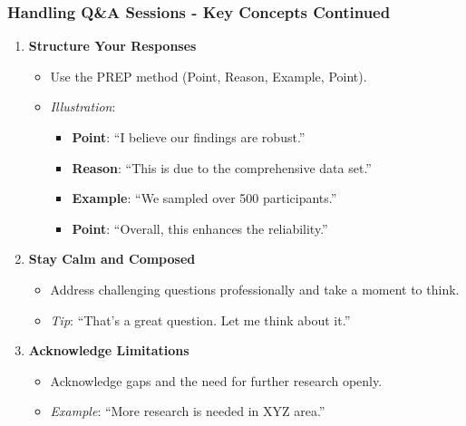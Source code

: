 \documentclass[aspectratio=169]{beamer}
\begin{document}
\begin{frame}[fragile]
    \frametitle{Handling Q\&A Sessions - Key Concepts Continued}
    \begin{enumerate}[resume]
        \item \textbf{Structure Your Responses}
        \begin{itemize}
            \item Use the PREP method (Point, Reason, Example, Point).
            \item \textit{Illustration}: 
            \begin{itemize}
                \item \textbf{Point}: “I believe our findings are robust.”
                \item \textbf{Reason}: “This is due to the comprehensive data set.”
                \item \textbf{Example}: “We sampled over 500 participants.”
                \item \textbf{Point}: “Overall, this enhances the reliability.”
            \end{itemize}
        \end{itemize}

        \item \textbf{Stay Calm and Composed}
        \begin{itemize}
            \item Address challenging questions professionally and take a moment to think.
            \item \textit{Tip}: “That’s a great question. Let me think about it.”
        \end{itemize}

        \item \textbf{Acknowledge Limitations}
        \begin{itemize}
            \item Acknowledge gaps and the need for further research openly.
            \item \textit{Example}: “More research is needed in XYZ area.”
        \end{itemize}
    \end{enumerate}
\end{frame}
\end{document}
